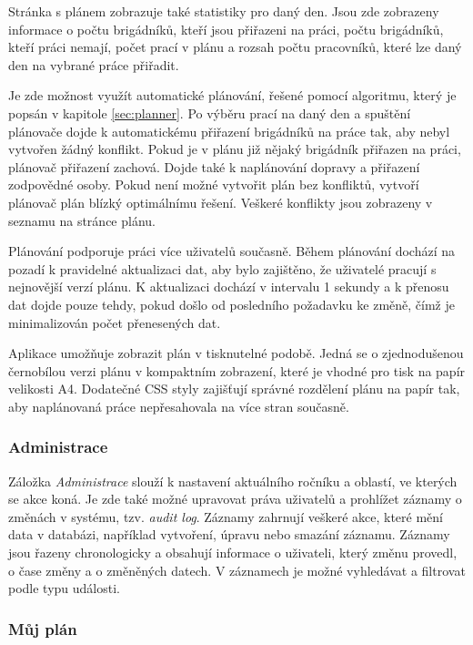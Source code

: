 Stránka s plánem zobrazuje také statistiky pro daný den. Jsou zde zobrazeny informace o počtu brigádníků, kteří jsou přiřazeni na práci, počtu brigádníků, kteří
práci nemají, počet prací v plánu a rozsah počtu pracovníků, které lze daný den na vybrané práce přiřadit.

Je zde možnost využít automatické plánování, řešené pomocí algoritmu, který je popsán v kapitole \ref{sec:planner}. Po výběru prací na daný den a spuštění
plánovače dojde k automatickému přiřazení brigádníků na práce tak, aby nebyl vytvořen žádný konflikt. Pokud je v plánu již nějaký brigádník přiřazen na práci, 
plánovač přiřazení zachová. Dojde také k naplánování dopravy a přiřazení zodpovědné osoby. Pokud není možné vytvořit plán bez konfliktů, 
vytvoří plánovač plán blízký optimálnímu řešení. Veškeré konflikty jsou zobrazeny v seznamu na stránce plánu.

Plánování podporuje práci více uživatelů současně. Během plánování dochází na pozadí k pravidelné aktualizaci dat, aby bylo zajištěno,
že uživatelé pracují s nejnovější verzí plánu. K aktualizaci dochází v intervalu 1 sekundy a k přenosu dat dojde pouze tehdy, pokud došlo od posledního požadavku ke změně,
čímž je minimalizován počet přenesených dat.

Aplikace umožňuje zobrazit plán v tisknutelné podobě. Jedná se o zjednodušenou černobílou verzi plánu v kompaktním zobrazení, které je vhodné pro tisk na 
papír velikosti A4. Dodatečné CSS styly zajišťují správné rozdělení plánu na papír tak, aby naplánovaná práce nepřesahovala na více stran současně.

\subsubsection{Administrace}

Záložka \textit{Administrace} slouží k nastavení aktuálního ročníku a oblastí, ve kterých se akce koná. Je zde také možné upravovat
práva uživatelů a prohlížet záznamy o změnách v systému, tzv. \textit{audit log}. Záznamy zahrnují veškeré akce, které mění data v databázi,
například vytvoření, úpravu nebo smazání záznamu. Záznamy jsou řazeny chronologicky a obsahují informace o uživateli, který změnu provedl,
o čase změny a o změněných datech. V záznamech je možné vyhledávat a filtrovat podle typu události.

\subsubsection{Můj plán}

